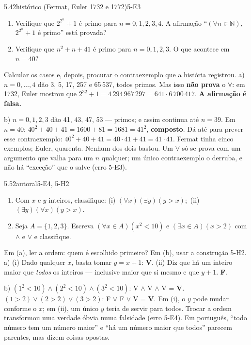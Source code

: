 \begin{exemplo}{5.4}{2}{histórico (Fermat, Euler 1732 e 1772)}{5-E3}\label{ex:5.4}
\begin{enumerate}[label=\alph*)]
  \item Verifique que $2^{2^n}+1$ é primo para $n=0,1,2,3,4$. A afirmação \enquote{$(\forall n\in\mathbb{N})$, $2^{2^n}+1$ é primo} está provada?
  \item Verifique que $n^2+n+41$ é primo para $n=0,1,2,3$. O que acontece em $n=40$?
\end{enumerate}
\plano Calcular os casos e, depois, procurar o contraexemplo que a história registrou.
\resolucao
a) $n=0,\ldots,4$ dão 3, 5, 17, 257 e 65\,537, todos primos. Mas isso \textbf{não prova} o $\forall$: em 1732, Euler mostrou que $2^{32}+1=4\,294\,967\,297=641\cdot6\,700\,417$. \textbf{A afirmação é falsa.}
\par b) $n=0,1,2,3$ dão 41, 43, 47, 53 — primos; e assim continua até $n=39$. Em $n=40$: $40^2+40+41=1600+81=1681=41^2$, \textbf{composto}. Dá até para prever esse contraexemplo: $40^2+40+41=40\cdot41+41=41\cdot41$.
\comentario Fermat tinha cinco exemplos; Euler, quarenta. Nenhum dos dois bastou. Um $\forall$ só se prova com um argumento que valha para um $n$ qualquer; um único contraexemplo o derruba, e não há \enquote{exceção} que o salve (erro 5-E3).
\end{exemplo}

\begin{exemplo}{5.5}{2}{autoral}{5-E4, 5-H2}\label{ex:5.5}
\begin{enumerate}[label=\alph*)]
  \item Com $x$ e $y$ inteiros, classifique: (i) $(\forall x)(\exists y)(y>x)$;\ (ii) $(\exists y)(\forall x)(y>x)$.
  \item Seja $A=\{1,2,3\}$. Escreva $(\forall x\in A)(x^2<10)$ e $(\exists x\in A)(x>2)$ com $\wedge$ e $\vee$ e classifique.
\end{enumerate}
\plano Em (a), ler a ordem: quem é escolhido primeiro? Em (b), usar a construção 5-H2.
\resolucao
a) (i) Dado qualquer $x$, basta tomar $y=x+1$: \textbf{V}. (ii) Diz que há um inteiro maior que \emph{todos} os inteiros — inclusive maior que si mesmo e que $y+1$. \textbf{F}.
\par b) $(1^2<10)\wedge(2^2<10)\wedge(3^2<10)$: V $\wedge$ V $\wedge$ V = \textbf{V}. $(1>2)\vee(2>2)\vee(3>2)$: F $\vee$ F $\vee$ V = \textbf{V}.
\comentario Em (i), o $y$ pode mudar conforme o $x$; em (ii), um único $y$ teria de servir para todos. Trocar a ordem transformou uma verdade óbvia numa falsidade (erro 5-E4). Em português, \enquote{todo número tem um número maior} e \enquote{há um número maior que todos} parecem parentes, mas dizem coisas opostas.
\end{exemplo}

